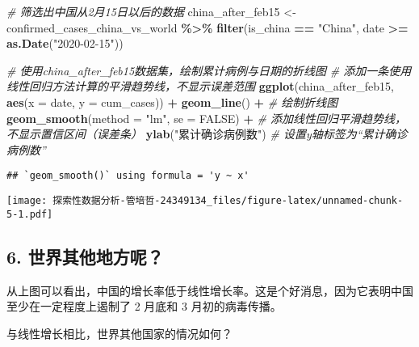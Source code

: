 \documentclass[
]{article}
\newenvironment{Shaded}{\begin{snugshade}}{\end{snugshade}}
\newcommand{\AttributeTok}[1]{\textcolor[rgb]{0.13,0.29,0.53}{#1}}
\newcommand{\CommentTok}[1]{\textcolor[rgb]{0.56,0.35,0.01}{\textit{#1}}}
\newcommand{\ConstantTok}[1]{\textcolor[rgb]{0.56,0.35,0.01}{#1}}
\newcommand{\FunctionTok}[1]{\textcolor[rgb]{0.13,0.29,0.53}{\textbf{#1}}}
\newcommand{\NormalTok}[1]{#1}
\newcommand{\OtherTok}[1]{\textcolor[rgb]{0.56,0.35,0.01}{#1}}
\newcommand{\SpecialCharTok}[1]{\textcolor[rgb]{0.81,0.36,0.00}{\textbf{#1}}}
\newcommand{\StringTok}[1]{\textcolor[rgb]{0.31,0.60,0.02}{#1}}
\begin{document}
\begin{Shaded}
\begin{Highlighting}[]
\CommentTok{\# 筛选出中国从2月15日以后的数据}
\NormalTok{china\_after\_feb15 }\OtherTok{\textless{}{-}}\NormalTok{ confirmed\_cases\_china\_vs\_world }\SpecialCharTok{\%\textgreater{}\%}
  \FunctionTok{filter}\NormalTok{(is\_china }\SpecialCharTok{==} \StringTok{"China"}\NormalTok{, date }\SpecialCharTok{\textgreater{}=} \FunctionTok{as.Date}\NormalTok{(}\StringTok{"2020{-}02{-}15"}\NormalTok{))}

\CommentTok{\# 使用china\_after\_feb15数据集，绘制累计病例与日期的折线图}
\CommentTok{\# 添加一条使用线性回归方法计算的平滑趋势线，不显示误差范围}
\FunctionTok{ggplot}\NormalTok{(china\_after\_feb15, }\FunctionTok{aes}\NormalTok{(}\AttributeTok{x =}\NormalTok{ date, }\AttributeTok{y =}\NormalTok{ cum\_cases)) }\SpecialCharTok{+}
  \FunctionTok{geom\_line}\NormalTok{() }\SpecialCharTok{+}  \CommentTok{\# 绘制折线图}
  \FunctionTok{geom\_smooth}\NormalTok{(}\AttributeTok{method =} \StringTok{"lm"}\NormalTok{, }\AttributeTok{se =} \ConstantTok{FALSE}\NormalTok{) }\SpecialCharTok{+}  \CommentTok{\# 添加线性回归平滑趋势线，不显示置信区间（误差条）}
  \FunctionTok{ylab}\NormalTok{(}\StringTok{"累计确诊病例数"}\NormalTok{)  }\CommentTok{\# 设置y轴标签为“累计确诊病例数”}
\end{Highlighting}
\end{Shaded}

\begin{verbatim}
## `geom_smooth()` using formula = 'y ~ x'
\end{verbatim}

\texttt{[image: 探索性数据分析-管培哲-24349134\_files/figure-latex/unnamed-chunk-5-1.pdf]}

\subsection{6.
世界其他地方呢？}\label{ux4e16ux754cux5176ux4ed6ux5730ux65b9ux5462}

从上图可以看出，中国的增长率低于线性增长率。这是个好消息，因为它表明中国至少在一定程度上遏制了
2 月底和 3 月初的病毒传播。

与线性增长相比，世界其他国家的情况如何？
\end{document}
